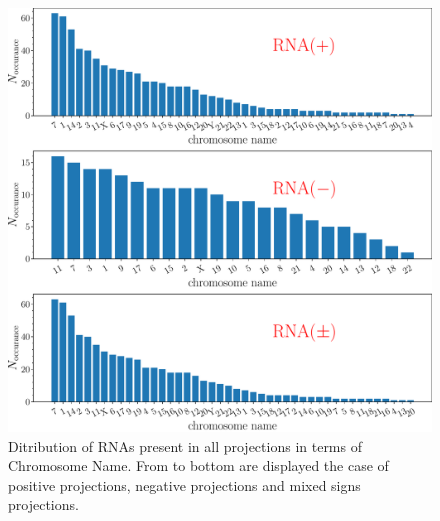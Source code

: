 \documentclass[10pt,a4paper]{article}
\begin{document}
\begin{figure}[h!]
\centering
\includegraphics[scale=0.3]{dist-chromosome_name-size.pdf}
\caption{\label{fig:chromosomename-distr}Ditribution of RNAs present in all projections in terms of Chromosome Name. From to bottom are displayed the case of positive projections, negative projections and mixed signs projections.}
\end{figure}
\end{document}
